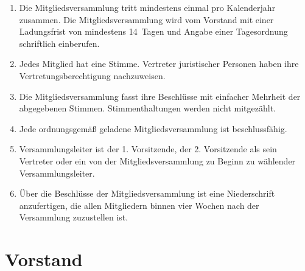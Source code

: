 \documentclass[a4paper, 10pt, headings=normal]{scrartcl}
\begin{document}
\begin{multicols}{2}
\begin{enumerate}[label={(\arabic*)}]
	\item
		Die Mitgliedsversammlung tritt mindestens einmal pro Kalenderjahr zusammen.
		Die Mitgliedsversammlung wird vom Vorstand mit einer Ladungsfrist von mindestens 14~Tagen und Angabe einer Tagesordnung schriftlich einberufen.
	\item
		Jedes Mitglied hat eine Stimme.
		Vertreter juristischer Personen haben ihre Vertretungsberechtigung nachzuweisen.
	\item
		Die Mitgliedsversammlung fasst ihre Beschlüsse mit einfacher Mehrheit der abgegebenen Stimmen.
		Stimmenthaltungen werden nicht mitgezählt.
	\item
		Jede ordnungsgemäß geladene Mitgliedsversammlung ist beschlussfähig.
	\item
		Versammlungsleiter ist der 1. Vorsitzende, der 2. Vorsitzende als sein Vertreter oder ein von der Mitgliedsversammlung zu Beginn zu wählender Versammlungsleiter.
	\item
		Über die Beschlüsse der Mitgliedsversammlung ist eine Niederschrift anzufertigen, die allen Mitgliedern binnen vier Wochen nach der Versammlung zuzustellen ist.
\end{enumerate}

\section{Vorstand}
\label{par:vorstand}


\end{multicols}
\end{document}
